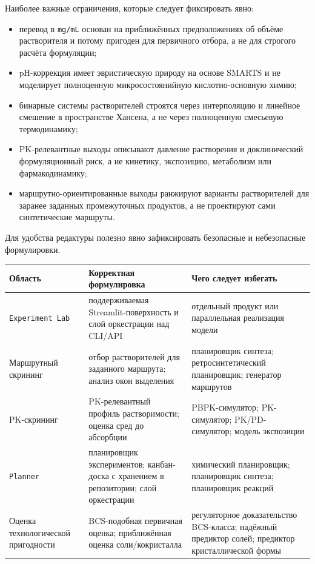 \documentclass[11pt]{article}
\begin{document}
Наиболее важные ограничения, которые следует фиксировать явно:
\begin{itemize}
  \item перевод в \texttt{mg/mL} основан на приближённых предположениях об объёме растворителя и потому пригоден для первичного отбора, а не для строгого расчёта формуляции;
  \item pH-коррекция имеет эвристическую природу на основе SMARTS и не моделирует полноценную микросостоянийную кислотно-основную химию;
  \item бинарные системы растворителей строятся через интерполяцию и линейное смешение в пространстве Хансена, а не через полноценную смесьевую термодинамику;
  \item PK-релевантные выходы описывают давление растворения и доклинический формуляционный риск, а не кинетику, экспозицию, метаболизм или фармакодинамику;
  \item маршрутно-ориентированные выходы ранжируют варианты растворителей для заранее заданных промежуточных продуктов, а не проектируют сами синтетические маршруты.
\end{itemize}

Для удобства редактуры полезно явно зафиксировать безопасные и небезопасные формулировки.

\begin{center}
\small
\begin{tabularx}{\textwidth}{|p{}|Y|Y|}
\hline
\textbf{Область} & \textbf{Корректная формулировка} & \textbf{Чего следует избегать} \\
\hline
\texttt{Experiment Lab} & поддерживаемая Streamlit-поверхность и слой оркестрации над CLI/API & отдельный продукт или параллельная реализация модели \\
\hline
Маршрутный скрининг & отбор растворителей для заданного маршрута; анализ окон выделения & планировщик синтеза; ретросинтетический планировщик; генератор маршрутов \\
\hline
PK-скрининг & PK-релевантный профиль растворимости; оценка сред до абсорбции & PBPK-симулятор; PK-симулятор; PK/PD-симулятор; модель экспозиции \\
\hline
\texttt{Planner} & планировщик экспериментов; канбан-доска с хранением в репозитории; слой оркестрации & химический планировщик; планировщик синтеза; планировщик реакций \\
\hline
Оценка технологической пригодности & BCS-подобная первичная оценка; приближённая оценка соли/кокристалла & регуляторное доказательство BCS-класса; надёжный предиктор солей; предиктор кристаллической формы \\
\hline
\end{tabularx}
\normalsize
\end{center}
\end{document}
